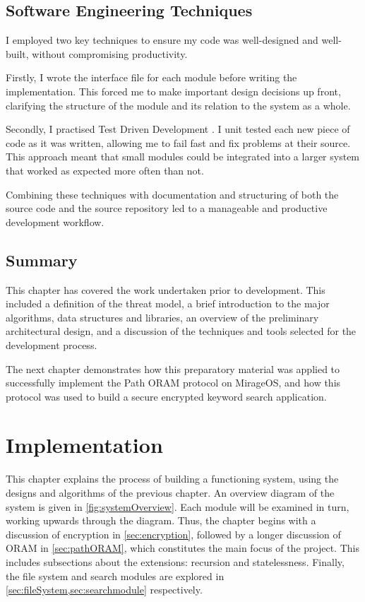 \documentclass[12pt,a4paper,twoside,openright]{report}
\begin{document}
\section{Software Engineering Techniques}

I employed two key techniques to ensure my code was well-designed and well-built, without compromising productivity.

Firstly, I wrote the interface file for each module before writing the implementation. This forced me to make important design decisions up front, clarifying the structure of the module and its relation to the system as a whole.

Secondly, I practised Test Driven Development \cite{hunt2004pragmatic}. I unit tested each new piece of code as it was written, allowing me to fail fast and fix problems at their source. This approach meant that small modules could be integrated into a larger system that worked as expected more often than not.

Combining these techniques with documentation and structuring of both the source code and the source repository led to a manageable and productive development workflow.

\section{Summary}

This chapter has covered the work undertaken prior to development. This included a definition of the threat model, a brief introduction to the major algorithms, data structures and libraries, an overview of the preliminary architectural design, and a discussion of the techniques and tools selected for the development process.

The next chapter demonstrates how this preparatory material was applied to successfully implement the Path ORAM protocol on MirageOS, and how this protocol was used to build a secure encrypted keyword search application.

\chapter{Implementation}

This chapter explains the process of building a functioning system, using the designs and algorithms of the previous chapter. An overview diagram of the system is given in \cref{fig:systemOverview}. Each module will be examined in turn, working upwards through the diagram. Thus, the chapter begins with a discussion of encryption in \cref{sec:encryption}, followed by a longer discussion of ORAM in \cref{sec:pathORAM}, which constitutes the main focus of the project. This includes subsections about the extensions: recursion and statelessness. Finally, the file system and search modules are explored in \cref{sec:fileSystem,sec:searchmodule} respectively.
\end{document}
